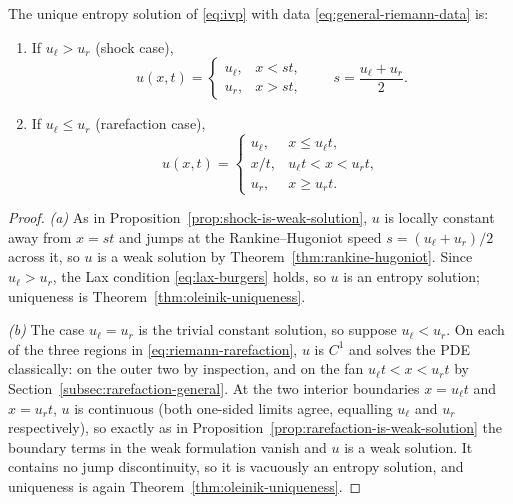\begin{theorem}
\label{thm:riemann-solution}
The unique entropy solution of \eqref{eq:ivp} with data
\eqref{eq:general-riemann-data} is:
\begin{enumerate}
  \item[\textup{(a)}] If $u_\ell > u_r$ (shock case),
  \begin{equation}
    \label{eq:riemann-shock}
    u(x,t) = \begin{cases} u_\ell, & x < st, \\ u_r, & x > st, \end{cases}
    \qquad s = \frac{u_\ell+u_r}{2}.
  \end{equation}
  \item[\textup{(b)}] If $u_\ell \leq u_r$ (rarefaction case),
  \begin{equation}
    \label{eq:riemann-rarefaction}
    u(x,t) = \begin{cases}
      u_\ell, & x \le u_\ell t, \\
      x/t, & u_\ell t < x < u_r t, \\
      u_r, & x \ge u_r t.
    \end{cases}
  \end{equation}
\end{enumerate}
\end{theorem}

\begin{proof}
\emph{(a)} As in Proposition~\ref{prop:shock-is-weak-solution}, $u$ is
locally constant away from $x=st$ and jumps at the Rankine--Hugoniot
speed $s=(u_\ell+u_r)/2$ across it, so $u$ is a weak solution by
Theorem~\ref{thm:rankine-hugoniot}. Since $u_\ell>u_r$, the Lax condition
\eqref{eq:lax-burgers} holds, so $u$ is an entropy solution; uniqueness is
Theorem~\ref{thm:oleinik-uniqueness}.

\emph{(b)} The case $u_\ell=u_r$ is the trivial constant solution, so
suppose $u_\ell<u_r$. On each of the three regions in
\eqref{eq:riemann-rarefaction}, $u$ is $C^1$ and solves the PDE
classically: on the outer two by inspection, and on the fan
$u_\ell t<x<u_r t$ by Section~\ref{subsec:rarefaction-general}. At the two
interior boundaries $x=u_\ell t$ and $x=u_r t$, $u$ is continuous (both
one-sided limits agree, equalling $u_\ell$ and $u_r$ respectively), so
exactly as in Proposition~\ref{prop:rarefaction-is-weak-solution} the
boundary terms in the weak formulation vanish and $u$ is a weak solution.
It contains no jump discontinuity, so it is vacuously an entropy
solution, and uniqueness is again Theorem~\ref{thm:oleinik-uniqueness}.
\end{proof}


